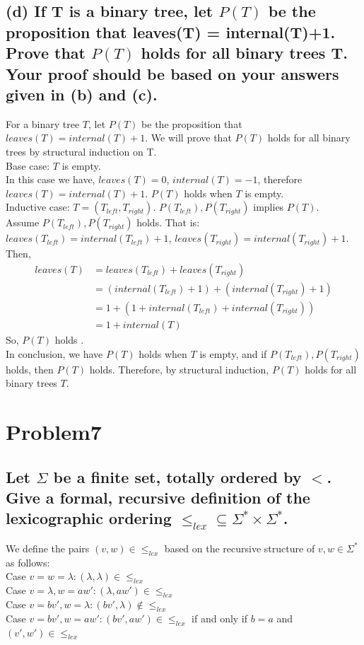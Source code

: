 \documentclass[]{article}
\begin{document}
\begin{spacing}{1.5}
		\subsection*{(d) If T is a binary tree, let $ P(T) $ be the proposition that leaves(T) = internal(T)+1. Prove that $ P(T) $ holds for all binary trees T. Your proof should be based on your answers given in (b) and (c). }
		For a binary tree $ T $, let $ P(T)	$ be the proposition that $ leaves(T) = internal(T) + 1 $. We will prove that $ P(T) $ holds for all binary trees by structural induction on T.\\
		Base case: $ T $ is empty.\\
		In this case we have, $ leaves(T)=0 $, $ internal(T)=-1 $, therefore $ leaves(T) = internal(T) + 1 $. $ P(T) $ holds when $ T $ is empty.\\
		Inductive case: $ T=(T_{left}, T_{right}) $. $ P(T_{left}), P(T_{right})$ implies $P(T) $.\\
		Assume $ P(T_{left}), P(T_{right})$ holds. That is: $ leaves(T_{left}) = internal(T_{left}) + 1 $, $ leaves(T_{right}) = internal(T_{right}) + 1 $. Then, 
		\[\begin{array}{rl}
			 leaves(T) &= leaves(T_{left}) + leaves(T_{right}) \\
			&= ( internal(T_{left}) + 1 )+  (internal(T_{right}) + 1) \\
			&=  1 + (1 + internal(T_{left}) + internal(T_{right})) \\
			&= 1+internal(T)
		\end{array}\]
		So,  $ P(T) $ holds .\\
		In conclusion, we have $ P(T) $ holds when $ T $ is empty, and if $ P(T_{left}), P(T_{right})$ holds, then $ P(T) $ holds. Therefore, by structural induction, $ P(T) $ holds for all binary trees $ T $.

		\section*{Problem7}
		\subsection*{Let $\Sigma$ be a finite set, totally ordered by $ < $. Give a formal, recursive definition of the lexicographic ordering $ \leq_{lex} \subseteq \Sigma^{*} \times \Sigma^{*} $.}
	 	We define the pairs $ (v, w) \in \leq_{lex} $ based on the recursive structure of $ v, w \in \Sigma^{*} $ as follows:\\
	 	Case $ v = w = \lambda: (\lambda, \lambda) \in \leq_{lex} $\\
	 	Case $ v = \lambda, w = aw': (\lambda, aw') \in \leq_{lex} $\\
	 	Case $ v = bv', w = \lambda: (bv', \lambda) \notin \leq_{lex} $\\
	 	Case $ v = bv',  w = aw': (bv', aw') \in \leq_{lex}$ if and only if $ b=a $ and $ (v', w') \in \leq_{lex} $
	\end{spacing}
\end{document}
